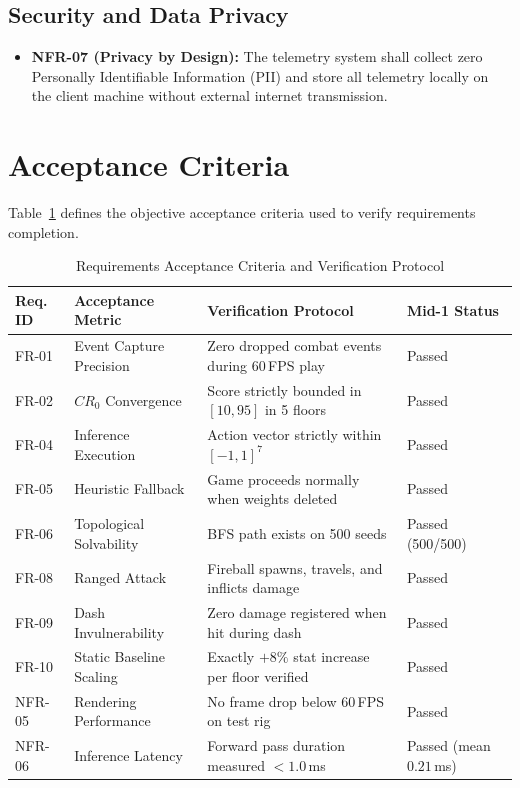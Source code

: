 \subsection{Security and Data Privacy}
\begin{itemize}
    \item \textbf{NFR-07 (Privacy by Design):} The telemetry system shall collect zero Personally Identifiable Information (PII) and store all telemetry locally on the client machine without external internet transmission.
\end{itemize}

\section{Acceptance Criteria}
Table~\ref{tab:acceptance_criteria} defines the objective acceptance criteria used to verify requirements completion.

\begin{table}[!htbp]
\centering
\caption{Requirements Acceptance Criteria and Verification Protocol}
\label{tab:acceptance_criteria}
\small
\begin{tabular}{p{}p{}p{}p{}}
\toprule
\textbf{Req. ID} & \textbf{Acceptance Metric} & \textbf{Verification Protocol} & \textbf{Mid-1 Status} \\
\midrule
FR-01 & Event Capture Precision & Zero dropped combat events during 60\,FPS play & Passed \\
FR-02 & $CR_0$ Convergence & Score strictly bounded in $[10, 95]$ in 5 floors & Passed \\
FR-04 & Inference Execution & Action vector strictly within $[-1, 1]^7$ & Passed \\
FR-05 & Heuristic Fallback & Game proceeds normally when weights deleted & Passed \\
FR-06 & Topological Solvability & BFS path exists on 500 seeds & Passed (500/500) \\
FR-08 & Ranged Attack & Fireball spawns, travels, and inflicts damage & Passed \\
FR-09 & Dash Invulnerability & Zero damage registered when hit during dash & Passed \\
FR-10 & Static Baseline Scaling & Exactly $+8\%$ stat increase per floor verified & Passed \\
NFR-05 & Rendering Performance & No frame drop below 60\,FPS on test rig & Passed \\
NFR-06 & Inference Latency & Forward pass duration measured $<1.0$\,ms & Passed (mean $0.21$\,ms) \\
\bottomrule
\end{tabular}
\end{table}

